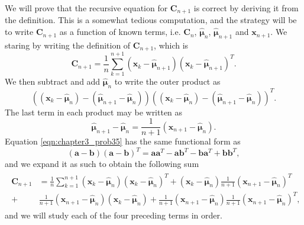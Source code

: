 \documentclass[12pt, a4paper]{article}
\newcommand{\vect}[1]{\bm{#1}}
\begin{document}
\begin{easylist}[enumerate]
	We will prove that the recursive equation for $\vect{C}_{n+1}$ is correct by deriving it from the definition.
	This is a somewhat tedious computation, and the strategy will be to write $\vect{C}_{n+1}$ as a function of known terms, i.e. $\vect{C}_{n}$, $\hat{\vect{\mu}}_n$, $\hat{\vect{\mu}}_{n+1}$ and $\vect{x}_{n+1}$.
	We staring by writing the definition of $\vect{C}_{n+1}$, which is
	\begin{equation*}
	\vect{C}_{n+1} = \frac{1}{n} \sum_{k=1}^{n+1} \left( \vect{x}_k - \hat{\vect{\mu}}_{n+1}\right) \left( \vect{x}_k - \hat{\vect{\mu}}_{n+1}\right)^T.
	\end{equation*}
	We then subtract and add $\hat{\vect{\mu}}_{n}$ to write the outer product as
	\begin{equation}
	\label{eqn:chapter3_prob35}
	\left( 
	\left( \vect{x}_k - \hat{\vect{\mu}}_{n}\right)
	- 
	\left( \hat{\vect{\mu}}_{n+1} - \hat{\vect{\mu}}_{n} \right)
	\right) 
	\left( 
	\left( \vect{x}_k - \hat{\vect{\mu}}_{n}\right)
	- 
	\left( \hat{\vect{\mu}}_{n+1} - \hat{\vect{\mu}}_{n} \right)
	\right) ^T.
	\end{equation}
	The last term in each product may be written as
	\begin{equation*}
	\hat{\vect{\mu}}_{n+1} - \hat{\vect{\mu}}_{n} = \frac{1}{n +1} \left( \vect{x}_{n+1} -  \hat{\vect{\mu}}_{n} \right).
	\end{equation*}
	Equation \eqref{eqn:chapter3_prob35} has the same functional form as 
	\begin{equation*}
	(\vect{a} - \vect{b}) (\vect{a} - \vect{b})^T = \vect{a} \vect{a}^T - \vect{a} \vect{b}^T - \vect{b}\vect{a}^T + \vect{b} \vect{b}^T,
	\end{equation*}
	and we expand it as such to obtain the following sum
	\begin{align}
	\begin{split}
	\label{eqn:eq3_problem35_2}
	\vect{C}_{n+1} &= \frac{1}{n} \sum_{k=1}^{n+1}  
	\left( \vect{x}_k  - \hat{\vect{\mu}}_n \right)\left( \vect{x}_k  - \hat{\vect{\mu}}_n \right)^T 
	+  \left( \vect{x}_{k}  - \hat{\vect{\mu}}_n \right) \frac{1}{n+1}\left( \vect{x}_{n+1} - \hat{\vect{\mu}}_n \right)^T \\
	+ &   \frac{1}{n+1}\left( \vect{x}_{n+1} - \hat{\vect{\mu}}_n \right)   \left( \vect{x}_k  - \hat{\vect{\mu}}_n \right) 
	+  \frac{1}{n+1}\left( \vect{x}_{n+1} - \hat{\vect{\mu}}_n \right) \frac{1}{n+1}\left( \vect{x}_{n+1} - \hat{\vect{\mu}}_n \right)^T,
	\end{split}
	\end{align}
	and we will study each of the four preceding terms in order.
	

\end{easylist}
\end{document}
